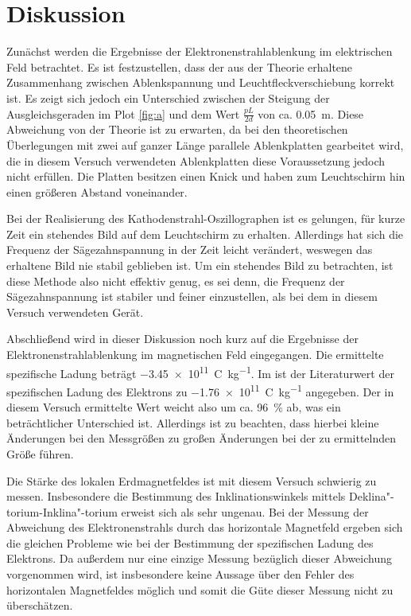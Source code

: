 
\section{Diskussion}
Zunächst werden die Ergebnisse der Elektronenstrahlablenkung im
elektrischen Feld betrachtet. Es ist festzustellen, dass der aus der
Theorie erhaltene Zusammenhang zwischen Ablenkspannung und
Leuchtfleckverschiebung korrekt ist. Es zeigt sich jedoch ein
Unterschied zwischen der Steigung der Ausgleichsgeraden im Plot
\ref{fig:a} und dem Wert $\frac{pL}{2d}$ von
ca. \SI{0.05}{\metre}. Diese Abweichung von der Theorie ist zu erwarten,
da bei den theoretischen Überlegungen mit zwei auf ganzer Länge
parallele Ablenkplatten gearbeitet wird, die in diesem Versuch
verwendeten Ablenkplatten diese Voraussetzung jedoch nicht erfüllen. Die
Platten besitzen einen Knick und haben zum Leuchtschirm hin einen
größeren Abstand voneinander.

Bei der Realisierung des Kathodenstrahl-Oszillographen ist es gelungen,
für kurze Zeit ein stehendes Bild auf dem Leuchtschirm zu
erhalten. Allerdings hat sich die Frequenz der Sägezahnspannung in der
Zeit leicht verändert, weswegen das erhaltene Bild nie stabil geblieben
ist. Um ein stehendes Bild zu betrachten, ist diese Methode also nicht
effektiv genug, es sei denn, die Frequenz der Sägezahnspannung ist
stabiler und feiner einzustellen, als bei dem in diesem Versuch
verwendeten Gerät.

Abschließend wird in dieser Diskussion noch kurz auf die Ergebnisse der
Elektronenstrahlablenkung im magnetischen Feld eingegangen. Die
ermittelte spezifische Ladung beträgt
\SI{-3.45e11}{\coulomb\per\kilo\gram}. Im \textcite{demtroeder-1} ist
der Literaturwert der spezifischen Ladung des Elektrons zu
\SI{-1.76e11}{\coulomb\per\kilo\gram} angegeben. Der in diesem Versuch
ermittelte Wert weicht also um ca. \SI{96}{\percent} ab, was ein
beträchtlicher Unterschied ist. Allerdings ist zu beachten, dass hierbei
kleine Änderungen bei den Messgrößen zu großen Änderungen bei der zu
ermittelnden Größe führen.

Die Stärke des lokalen Erdmagnetfeldes ist mit diesem Versuch schwierig
zu messen. Insbesondere die Bestimmung des Inklinationswinkels mittels
Deklina"-torium-Inklina"-torium erweist sich als sehr ungenau. Bei der
Messung der Abweichung des Elektronenstrahls durch das horizontale
Magnetfeld ergeben sich die gleichen Probleme wie bei der Bestimmung der
spezifischen Ladung des Elektrons. Da außerdem nur eine einzige Messung
bezüglich dieser Abweichung vorgenommen wird, ist insbesondere keine
Aussage über den Fehler des horizontalen Magnetfeldes möglich und somit
die Güte dieser Messung nicht zu überschätzen.
